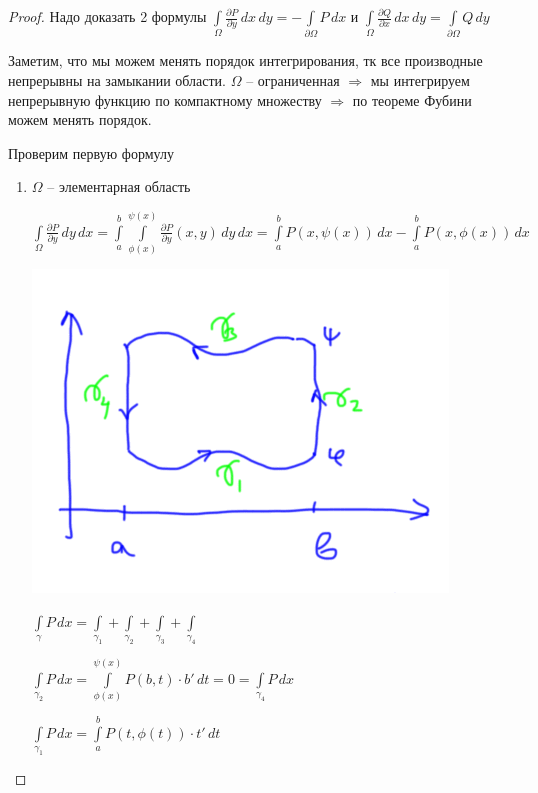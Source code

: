 \begin{proof}\thmslashn
	
	Надо доказать 2 формулы $\int\limits_\Omega \frac{\partial P}{\partial y}\,dx\,dy = -\int\limits_{\partial \Omega} P\,dx$ и $\int\limits_\Omega \frac{\partial Q}{\partial x}\,dx\,dy = \int\limits_{\partial \Omega} Q\,dy$
	
	Заметим, что мы можем менять порядок интегрирования, тк все производные непрерывны на замыкании области. $\Omega$ -- ограниченная $\Rightarrow$ мы интегрируем непрерывную функцию по компактному множеству $\Rightarrow$ по теореме Фубини можем менять порядок.
	
	Проверим первую формулу
	
	\begin{enumerate}[Шаг 1.]

		\item
		$\Omega$ -- элементарная область 
		
		$\int\limits_\Omega \frac{\partial P}{\partial y}\,dy\,dx = \int\limits_a^b\int\limits_{\phi(x)}^{\psi(x)} \frac{\partial P}{\partial y}(x, y) \,dy\,dx = \int\limits_a^b P(x, \psi(x)) \,dx -\int\limits_a^b P(x, \phi(x)) \,dx$
		
		\includegraphics[scale=0.5]{pic_1}
		
		$\int\limits_\gamma P \,dx = \int\limits_{\gamma_1} + \int\limits_{\gamma_2} + \int\limits_{\gamma_3} + \int\limits_{\gamma_4}$
		
		$\int\limits_{\gamma_2} P\,dx= \int\limits_{\phi(x)}^{\psi(x)} P(b, t) \cdot b' \,dt = 0 = \int\limits_{\gamma_4} P\,dx$
		
		$\int\limits_{\gamma_1} P\,dx = \int\limits_{a}^{b} P(t, \phi(t)) \cdot t' \,dt$
		

\end{enumerate}
\end{proof}
